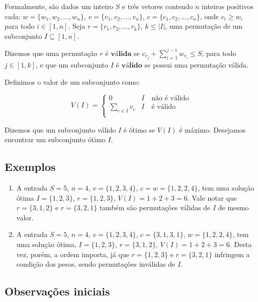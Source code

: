 Formalmente, são dados um inteiro $S$ e três vetores contendo $n$ inteiros positivos cada: $w = \{w_1, w_2, ..., w_n\}$, $v = \{v_1, v_2, ..., v_n\}$, $c = \{c_1, c_2, ..., c_n\}$, onde $c_i \geq w_i$ para todo $i \in [1, n]$. Seja $r = \{r_1, r_2, ..., r_k\}$, $k \leq |I|$, uma permutação de um subconjunto $I \subseteq [1, n]$. 

Dizemos que uma permutação $r$ é $\textbf{válida}$ se $c_{r_j} + \sum_{i = 1}^{j - 1} w_{r_i} \leq S$, para todo $j \in [1, k]$, e que um subconjunto $I$ é $\textbf{válido}$ se possui uma permutação válida.

Definimos o valor de um subconjunto como:

\begin{equation} \label{pd:val}
  V(I) =
  \begin{cases}
  0                      & I\quad\text{não é válido} \\
  \sum_{e \in I} v_{e}   & I\quad\text{é válido} \\
  \end{cases}
\end{equation}

Dizemos que um subconjunto válido $I$ é ótimo se $V(I)$ é máximo. Desejamos encontrar um subconjunto ótimo $I$.

\subsection*{Exemplos}

\begin{enumerate}
    \item A entrada $S = 5$, $n = 4$, $v = \{1, 2, 3, 4\}$, $c = w = \{1, 2, 2, 4\}$, tem uma solução ótima $I = \{1, 2, 3\}$, $r = \{1, 2, 3\}$, $V(I) = 1 + 2 + 3 = 6$. Vale notar que $r = \{3, 1, 2\}$ e $r = \{3, 2, 1\}$ também são permutações válidas de $I$ de mesmo valor.
    \item A entrada $S = 5$, $n = 4$, $v = \{1, 2, 3, 4\}$, $c = \{3, 1, 3, 1\}$, $w = \{1, 2, 2, 4\}$, tem uma solução ótima, $I = \{1, 2, 3\}$, $r = \{3, 1, 2\}$, $V(I) = 1 + 2 + 3 = 6$. Desta vez, porém, a ordem importa, já que $r = \{1, 2, 3\}$ e $r = \{3, 2, 1\}$ infringem a condição dos pesos, sendo permutações inválidas de $I$. \label{pd:ex2}
\end{enumerate}

\subsection*{Observações iniciais}

